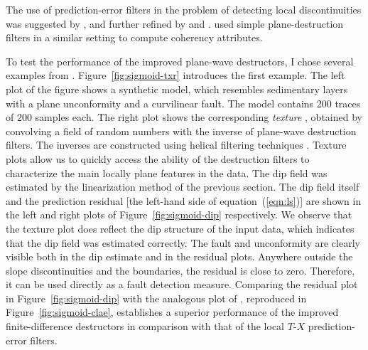 The use of prediction-error filters in the problem of detecting local
discontinuities was suggested by \cite{SEG-1994-1572,gee}, and
further refined by \cite{schwabSEG} and
\cite{Schwab.sepphd.99}. \cite{SEG-1998-0653} used simple
plane-destruction filters in a similar setting to compute coherency
attributes.
\par
To test the performance of the improved plane-wave destructors, I
chose several examples from \cite{gee}.
Figure~\ref{fig:sigmoid-txr} introduces the first example. The left
plot of the figure shows a synthetic model, which resembles
sedimentary layers with a plane unconformity and a curvilinear fault.
The model contains 200 traces of 200 samples each.
The right plot shows the corresponding \emph{texture}
\cite[]{EAE-1999-1009}, obtained by convolving a field of random
numbers with the inverse of plane-wave destruction filters. The
inverses are constructed using helical filtering techniques
\cite[]{GEO63-05-15321541,Fomel.sepphd.107}. Texture plots allow us to
quickly access the ability of the destruction filters to characterize
the main locally plane features in the data.  The dip field was
estimated by the linearization method of the previous section. The dip
field itself and the prediction residual [the left-hand side of
equation~(\ref{eqn:ls})] are shown in the left and right plots of
Figure~\ref{fig:sigmoid-dip} respectively. We observe that the
texture plot does reflect the dip structure of the input data, which
indicates that the dip field was estimated correctly. The fault and
unconformity are clearly visible both in the dip estimate and in the
residual plots. Anywhere outside the slope discontinuities and the
boundaries, the residual is close to zero.  Therefore, it can be used
directly as a fault detection measure.  Comparing the residual plot in
Figure~\ref{fig:sigmoid-dip} with the analogous plot of
\cite{SEG-1994-1572,gee}, reproduced in
Figure~\ref{fig:sigmoid-clae}, establishes a superior performance of
the improved finite-difference destructors in comparison with that of
the local $T$-$X$ prediction-error filters.

